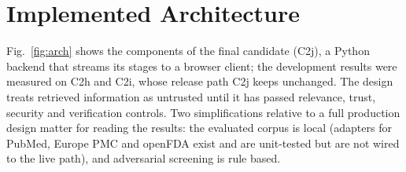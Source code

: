 \documentclass[conference]{IEEEtran}
\begin{document}
\section{Implemented Architecture}
\label{sec:arch}

Fig.~\ref{fig:arch} shows the components of the final candidate (C2j), a Python backend that streams its stages to a
browser client; the development results were measured on C2h and C2i, whose release path C2j keeps unchanged. The design treats retrieved information as untrusted until it has passed relevance, trust, security and
verification controls. Two simplifications relative to a full production design matter for reading the results: the
evaluated corpus is local (adapters for PubMed, Europe PMC and openFDA exist and are unit-tested but are not wired to
the live path), and adversarial screening is rule based.
\end{document}
